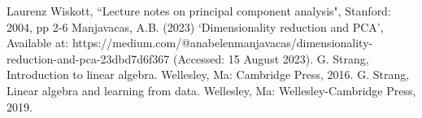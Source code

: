 \documentclass[conference]{IEEEtran}
\begin{document}
\begin{thebibliography}{00}
	 Laurenz Wiskott, ``Lecture notes on principal component analysis", Stanford: 2004, pp 2-6
	Manjavacas, A.B. (2023) ‘Dimensionality reduction and PCA’,  Available at: https://medium.com/@anabelenmanjavacas/dimensionality-reduction-and-pca-23dbd7d6f367 (Accessed: 15 August 2023).
	 G. Strang, Introduction to linear algebra. Wellesley, Ma: Cambridge Press, 2016.
	  G. Strang, Linear algebra and learning from data. Wellesley, Ma: Wellesley-Cambridge Press, 2019.
\end{thebibliography}
\vspace{12pt}
\end{document}
